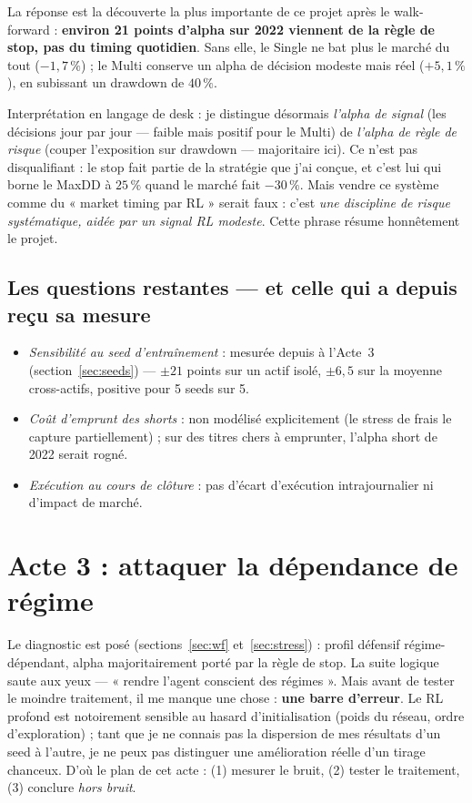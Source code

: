 \documentclass[11pt,a4paper]{article}
\begin{document}
La réponse est la découverte la plus importante de ce projet après le walk-forward :
\textbf{environ 21 points d'alpha sur 2022 viennent de la règle de stop, pas du timing
quotidien}. Sans elle, le Single ne bat plus le marché du tout ($-1{,}7\,\%$) ; le Multi
conserve un alpha de décision modeste mais réel ($+5{,}1\,\%$), en subissant un drawdown
de $40\,\%$.

Interprétation en langage de desk : je distingue désormais \emph{l'alpha de signal}
(les décisions jour par jour --- faible mais positif pour le Multi) de \emph{l'alpha de
règle de risque} (couper l'exposition sur drawdown --- majoritaire ici). Ce n'est pas
disqualifiant : le stop fait partie de la stratégie que j'ai conçue, et c'est lui qui
borne le MaxDD à $25\,\%$ quand le marché fait $-30\,\%$. Mais vendre ce système comme
du « market timing par RL » serait faux : c'est \emph{une discipline de risque
systématique, aidée par un signal RL modeste}. Cette phrase résume honnêtement le
projet.

\subsection{Les questions restantes --- et celle qui a depuis reçu sa mesure}

\begin{itemize}[itemsep=2pt]
  \item \emph{Sensibilité au seed d'entraînement} : mesurée depuis à
        l'Acte~3 (section~\ref{sec:seeds}) --- $\pm 21$ points sur un actif isolé,
        $\pm 6{,}5$ sur la moyenne cross-actifs, positive pour 5 seeds sur 5.
  \item \emph{Coût d'emprunt des shorts} : non modélisé explicitement (le stress de
        frais le capture partiellement) ; sur des titres chers à emprunter, l'alpha
        short de 2022 serait rogné.
  \item \emph{Exécution au cours de clôture} : pas d'écart d'exécution intrajournalier
        ni d'impact de marché.
\end{itemize}


\section{Acte 3 : attaquer la dépendance de régime}
\label{sec:acte3}

Le diagnostic est posé (sections~\ref{sec:wf} et~\ref{sec:stress}) : profil défensif
régime-dépendant, alpha majoritairement porté par la règle de stop. La suite logique
saute aux yeux --- « rendre l'agent conscient des régimes ». Mais avant de tester le
moindre traitement, il me manque une chose : \textbf{une barre d'erreur}. Le RL profond
est notoirement sensible au hasard d'initialisation (poids du réseau, ordre
d'exploration) ; tant que je ne connais pas la dispersion de mes résultats d'un seed à
l'autre, je ne peux pas distinguer une amélioration réelle d'un tirage chanceux. D'où le
plan de cet acte : (1) mesurer le bruit, (2) tester le traitement, (3) conclure
\emph{hors bruit}.
\end{document}
